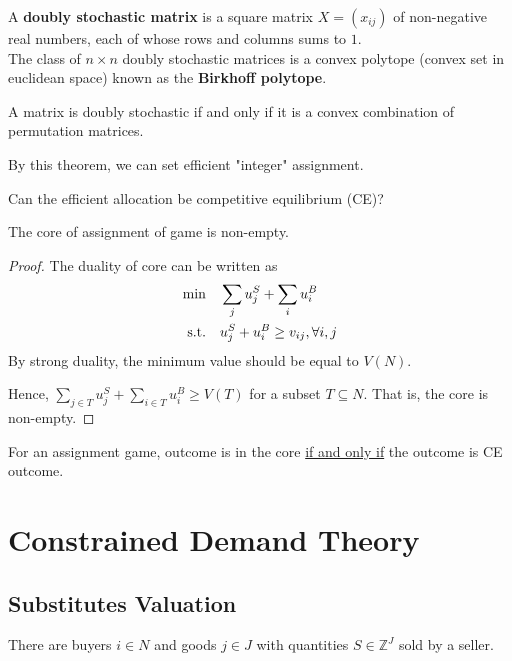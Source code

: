 \documentclass[11pt]{elegantbook}
\begin{document}
\begin{definition}
    \normalfont
    A \textbf{doubly stochastic matrix} is a square matrix $X=(x_{ij})$ of non-negative real numbers, each of whose rows and columns sums to $1$.\\
    The class of $n\times n$ doubly stochastic matrices is a convex polytope (convex set in euclidean space) known as the \textbf{Birkhoff polytope}.
\end{definition}

\begin{theorem}
    A matrix is doubly stochastic if and only if it is a convex combination of permutation matrices.
\end{theorem}
By this theorem, we can set efficient "integer" assignment.

Can the efficient allocation be competitive equilibrium (CE)?
\begin{theorem}
    The core of assignment of game is non-empty.
\end{theorem}
\begin{proof}
    The duality of core can be written as
    \begin{equation}
        \begin{aligned}
            \min \quad&  \sum_{j}u_j^S + \sum_{i}u_i^B\\
            \textnormal{s.t.}\quad& u_j^S+u_i^B\geq v_{ij}, \forall i,j
        \end{aligned}
        \nonumber
    \end{equation}
    By strong duality, the minimum value should be equal to $V(N)$.

    Hence, $\sum_{j\in T}u_j^S + \sum_{i\in T}u_i^B\geq V(T)$ for a subset $T\subseteq N$. That is, the core is non-empty.
\end{proof}

\begin{corollary}
    For an assignment game, outcome is in the core \underline{if and only if} the outcome is CE outcome.
\end{corollary}



\section{Constrained Demand Theory}
\subsection{Substitutes Valuation}
There are buyers $i\in N$ and goods $j\in J$ with quantities $S\in \mathbb{Z}^J$ sold by a seller.
\end{document}

